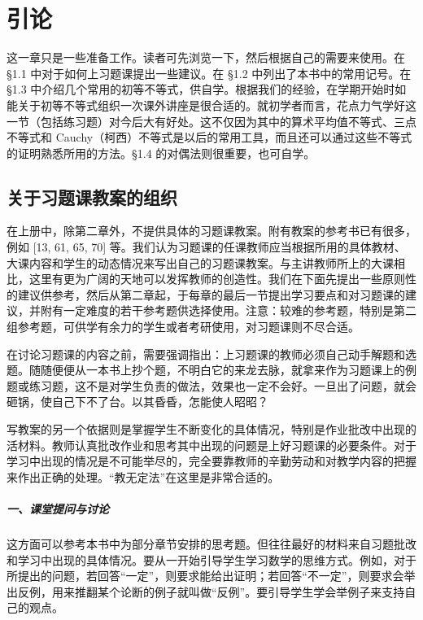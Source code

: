 \chapter{引论}


这一章只是一些准备工作。读者可先浏览一下，然后根据自己的需要来使用。在 §1.1 中对于如何上习题课提出一些建议。在 §1.2 中列出了本书中的常用记号。在 §1.3 中介绍几个常用的初等不等式，供自学。根据我们的经验，在学期开始时如能关于初等不等式组织一次课外讲座是很合适的。就初学者而言，花点力气学好这一节（包括练习题）对今后大有好处。这不仅因为其中的算术平均值不等式、三点不等式和 Cauchy（柯西）不等式是以后的常用工具，而且还可以通过这些不等式的证明熟悉所用的方法。§1.4 的对偶法则很重要，也可自学。

\section{关于习题课教案的组织}

在上册中，除第二章外，不提供具体的习题课教案。附有教案的参考书已有很多，例如 [13, 61, 65, 70] 等。我们认为习题课的任课教师应当根据所用的具体教材、大课内容和学生的动态情况来写出自己的习题课教案。与主讲教师所上的大课相比，这里有更为广阔的天地可以发挥教师的创造性。我们在下面先提出一些原则性的建议供参考，然后从第二章起，于每章的最后一节提出学习要点和对习题课的建议，并附有一定难度的若干参考题供选择使用。注意：较难的参考题，特别是第二组参考题，可供学有余力的学生或者考研使用，对习题课则不尽合适。

在讨论习题课的内容之前，需要强调指出：上习题课的教师必须自己动手解题和选题。随随便便从一本书上抄个题，不明白它的来龙去脉，就拿来作为习题课上的例题或练习题，这不是对学生负责的做法，效果也一定不会好。一旦出了问题，就会砸锅，使自己下不了台。以其昏昏，怎能使人昭昭？

写教案的另一个依据则是掌握学生不断变化的具体情况，特别是作业批改中出现的活材料。教师认真批改作业和思考其中出现的问题是上好习题课的必要条件。对于学习中出现的情况是不可能举尽的，完全要靠教师的辛勤劳动和对教学内容的把握来作出正确的处理。“教无定法”在这里是非常合适的。

\paragraph{一、课堂提问与讨论}
这方面可以参考本书中为部分章节安排的思考题。但往往最好的材料来自习题批改和学习中出现的具体情况。要从一开始引导学生学习数学的思维方式。例如，对于所提出的问题，若回答“一定”，则要求能给出证明；若回答“不一定”，则要求会举出反例，用来推翻某个论断的例子就叫做“反例”。要引导学生学会举例子来支持自己的观点。

